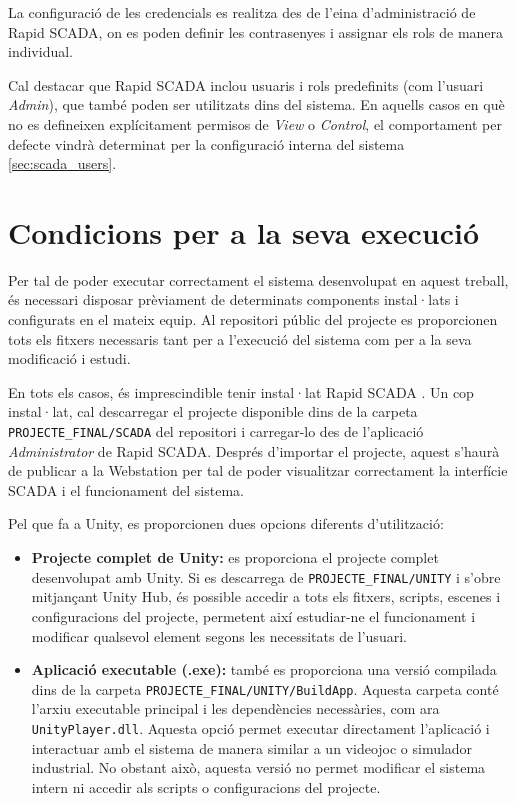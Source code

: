 \documentclass[a4paper,11pt,DIV=13,headings=normal,abstract=true,twoside=semi]{article}
\begin{document}
La configuració de les credencials es realitza des de l'eina d'administració de Rapid SCADA, on es poden definir les contrasenyes i assignar els rols de manera individual.

Cal destacar que Rapid SCADA inclou usuaris i rols predefinits (com l'usuari \textit{Admin}), que també poden ser utilitzats dins del sistema. En aquells casos en què no es defineixen explícitament permisos de \textit{View} o \textit{Control}, el comportament per defecte vindrà determinat per la configuració interna del sistema \ref{sec:scada_users}.

\newpage
\section{Condicions per a la seva execució}

Per tal de poder executar correctament el sistema desenvolupat en aquest treball, és necessari disposar prèviament de determinats components instal·lats i configurats en el mateix equip. Al repositori públic del projecte es proporcionen tots els fitxers necessaris tant per a l'execució del sistema com per a la seva modificació i estudi.

En tots els casos, és imprescindible tenir instal·lat Rapid SCADA \cite{rapidscada_windows_install}. Un cop instal·lat, cal descarregar el projecte disponible dins de la carpeta \texttt{PROJECTE\_FINAL/SCADA} del repositori i carregar-lo des de l'aplicació \textit{Administrator} de Rapid SCADA. Després d'importar el projecte, aquest s'haurà de publicar a la Webstation per tal de poder visualitzar correctament la interfície SCADA i el funcionament del sistema.

Pel que fa a Unity, es proporcionen dues opcions diferents d'utilització:

\begin{itemize}
    \item \textbf{Projecte complet de Unity:} es proporciona el projecte complet desenvolupat amb Unity. Si es descarrega de \texttt{PROJECTE\_FINAL/UNITY} i s'obre mitjançant Unity Hub, és possible accedir a tots els fitxers, scripts, escenes i configuracions del projecte, permetent així estudiar-ne el funcionament i modificar qualsevol element segons les necessitats de l'usuari.

    \item \textbf{Aplicació executable (.exe):} també es proporciona una versió compilada dins de la carpeta \texttt{PROJECTE\_FINAL/UNITY/BuildApp}. Aquesta carpeta conté l'arxiu executable principal i les dependències necessàries, com ara \texttt{UnityPlayer.dll}. Aquesta opció permet executar directament l'aplicació i interactuar amb el sistema de manera similar a un videojoc o simulador industrial. No obstant això, aquesta versió no permet modificar el sistema intern ni accedir als scripts o configuracions del projecte.
\end{itemize}
\end{document}
